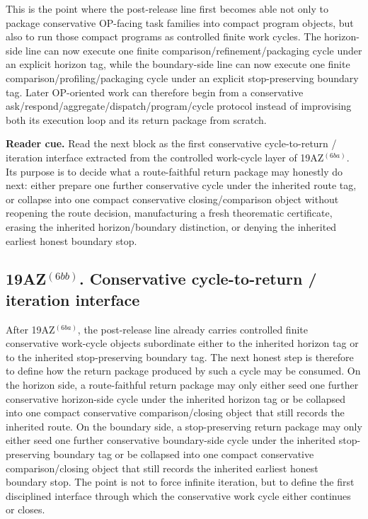 \begin{remark}
\label{rem:what-the-first-conservative-program-to-execution-work-cycle-layer-now-buys}
This is the point where the post-release line first becomes able not only to package conservative OP-facing task families into compact program objects, but also to run those compact programs as controlled finite work cycles. The horizon-side line can now execute one finite comparison/refinement/packaging cycle under an explicit horizon tag, while the boundary-side line can now execute one finite comparison/profiling/packaging cycle under an explicit stop-preserving boundary tag. Later OP-oriented work can therefore begin from a conservative ask/respond/aggregate/dispatch/program/cycle protocol instead of improvising both its execution loop and its return package from scratch.
\end{remark}



\noindent\textbf{Reader cue.} Read the next block as the first conservative cycle-to-return / iteration interface extracted from the controlled work-cycle layer of 19AZ$^{(6ba)}$. Its purpose is to decide what a route-faithful return package may honestly do next: either prepare one further conservative cycle under the inherited route tag, or collapse into one compact conservative closing/comparison object without reopening the route decision, manufacturing a fresh theorematic certificate, erasing the inherited horizon/boundary distinction, or denying the inherited earliest honest boundary stop.

\subsection*{19AZ$^{(6bb)}$. Conservative cycle-to-return / iteration interface}
\label{sec:first-conservative-cycle-to-return-iteration-interface-extracted-from-the-work-cycle-layer}
After 19AZ$^{(6ba)}$, the post-release line already carries controlled finite conservative work-cycle objects subordinate either to the inherited horizon tag or to the inherited stop-preserving boundary tag. The next honest step is therefore to define how the return package produced by such a cycle may be consumed. On the horizon side, a route-faithful return package may only either seed one further conservative horizon-side cycle under the inherited horizon tag or be collapsed into one compact conservative comparison/closing object that still records the inherited route. On the boundary side, a stop-preserving return package may only either seed one further conservative boundary-side cycle under the inherited stop-preserving boundary tag or be collapsed into one compact conservative comparison/closing object that still records the inherited earliest honest boundary stop. The point is not to force infinite iteration, but to define the first disciplined interface through which the conservative work cycle either continues or closes.

